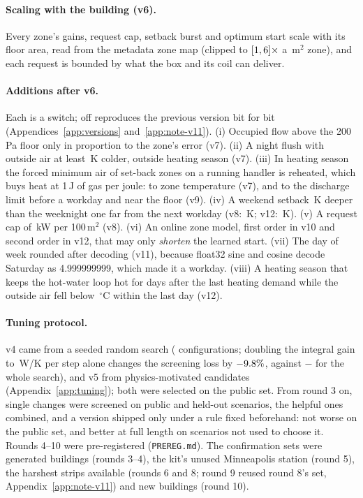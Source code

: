 \documentclass{article}
\begin{document}
\paragraph{Scaling with the building (v6).} Every zone's gains, request cap, setback burst and optimum start scale with its floor area, read from the metadata zone map (clipped to $[1, 6]\times$ a \ParAreaRef\,m$^2$ zone), and each request is bounded by what the box and its coil can deliver.

\paragraph{Additions after v6.} Each is a switch; off reproduces the previous version bit for bit (Appendices~\ref{app:versions} and~\ref{app:note-v11}). (i) Occupied flow above the 200\,Pa floor only in proportion to the zone's error (v7). (ii) A night flush with outside air at least \ParRFFlushDt\,K colder, outside heating season (v7). (iii) In heating season the forced minimum air of set-back zones on a running handler is reheated, which buys heat at 1\,J of gas per joule: to zone temperature (v7), and to the discharge limit before a workday and near the floor (v9). (iv) A weekend setback \RTenWkExtLo\,K deeper than the weeknight one far from the next workday (v8: \RTenWkExtLoVEleven\,K; v12: \RTenWkExtLo\,K). (v) A request cap of \RFiveParQcapKw\,kW per 100\,m$^2$ (v8). (vi) An online zone model, first order in v10 and second order in v12, that may only \emph{shorten} the learned start. (vii) The day of week rounded after decoding (v11), because float32 sine and cosine decode Saturday as 4.999999999, which made it a workday. (viii) A heating season that keeps the hot-water loop hot for \RTenSeasonDays{} days after the last heating demand while the outside air fell below \RTenSeasonOatC\,$^\circ$C within the last day (v12).

\paragraph{Tuning protocol.} v4 came from a seeded random search (\NTuneConfigs{} configurations; doubling the integral gain to \ParKiWPerKStep\,W/K per step alone changes the screening loss by $-9.8\%$, against $-$\RElvTuneGain{} for the whole search), and v5 from \NCandV{} physics-motivated candidates (Appendix~\ref{app:tuning}); both were selected on the public set. From round 3 on, single changes were screened on public and held-out scenarios, the helpful ones combined, and a version shipped only under a rule fixed beforehand: not worse on the public set, and better at full length on scenarios not used to choose it. Rounds 4--10 were pre-registered (\texttt{PREREG.md}). The confirmation sets were generated buildings (rounds 3--4), the kit's unused Minneapolis station (round 5), the harshest strips available (rounds 6 and 8; round 9 reused round 8's set, Appendix~\ref{app:note-v11}) and new buildings (round 10).
\end{document}
